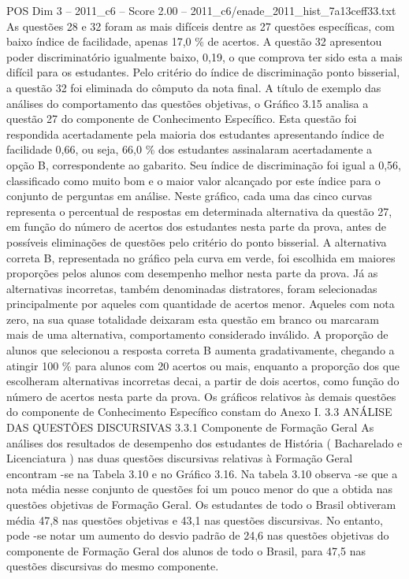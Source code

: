 \begin{textsample}{POS Dim 3 – 2011\_c6 – Score 2.00 – 2011\_c6/enade\_2011\_hist\_7a13ceff33.txt}
As questões 28 e 32 foram as mais difíceis dentre as 27 questões específicas, com baixo índice de facilidade, apenas 17,0 \% de acertos.
A questão 32 apresentou poder discriminatório igualmente baixo, 0,19, o que comprova ter sido esta a mais difícil para os estudantes.
Pelo critério do índice de discriminação ponto bisserial, a questão 32 foi eliminada do cômputo da nota final.
A título de exemplo das análises do comportamento das questões objetivas, o Gráfico 3.15 analisa a questão 27 do componente de Conhecimento Específico.
Esta questão foi respondida acertadamente pela maioria dos estudantes apresentando índice de facilidade 0,66, ou seja, 66,0 \% dos estudantes assinalaram acertadamente a opção B, correspondente ao gabarito.
Seu índice de discriminação foi igual a 0,56, classificado como muito bom e o maior valor alcançado por este índice para o conjunto de perguntas em análise.
Neste gráfico, cada uma das cinco curvas representa o percentual de respostas em determinada alternativa da questão 27, em função do número de acertos dos estudantes nesta parte da prova, antes de possíveis eliminações de questões pelo critério do ponto bisserial.
A alternativa correta B, representada no gráfico pela curva em verde, foi escolhida em maiores proporções pelos alunos com desempenho melhor nesta parte da prova.
Já as alternativas incorretas, também denominadas distratores, foram selecionadas principalmente por aqueles com quantidade de acertos menor.
Aqueles com nota zero, na sua quase totalidade deixaram esta questão em branco ou marcaram mais de uma alternativa, comportamento considerado inválido.
A proporção de alunos que selecionou a resposta correta B aumenta gradativamente, chegando a atingir 100 \% para alunos com 20 acertos ou mais, enquanto a proporção dos que escolheram alternativas incorretas decai, a partir de dois acertos, como função do número de acertos nesta parte da prova.
Os gráficos relativos às demais questões do componente de Conhecimento Específico constam do Anexo I. 3.3 ANÁLISE DAS QUESTÕES DISCURSIVAS 3.3.1 Componente de Formação Geral As análises dos resultados de desempenho dos estudantes de História ( Bacharelado e Licenciatura ) nas duas questões discursivas relativas à Formação Geral encontram -se na Tabela 3.10 e no Gráfico 3.16.
Na tabela 3.10 observa -se que a nota média nesse conjunto de questões foi um pouco menor do que a obtida nas questões objetivas de Formação Geral.
Os estudantes de todo o Brasil obtiveram média 47,8 nas questões objetivas e 43,1 nas questões discursivas.
No entanto, pode -se notar um aumento do desvio padrão de 24,6 nas questões objetivas do componente de Formação Geral dos alunos de todo o Brasil, para 47,5 nas questões discursivas do mesmo componente.

\end{textsample}
